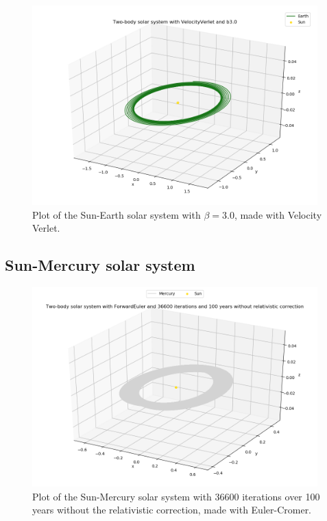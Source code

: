 \documentclass{article}
\begin{document}
    \begin{figure}[H]
        \centering
        \includegraphics[width = 11cm]{img/plot3D_S_E_V_b30.png}
        \caption{Plot of the Sun-Earth solar system with $\beta = 3.0$, made with Velocity Verlet.}
        \label{fig:plot3D_S_E_V_b30}
    \end{figure}


\subsection{Sun-Mercury solar system}

    \begin{figure}[H]
        \centering
        \includegraphics[width = 11cm]{img/plot3D_S_M_F_n36600_yr100_newton.png}
        \caption{Plot of the Sun-Mercury solar system with 36600 iterations over 100 years without the relativistic correction, made with Euler-Cromer.}
        \label{fig:plot3D_S_M_F_n36600_yr100_newton}
    \end{figure}
\end{document}
